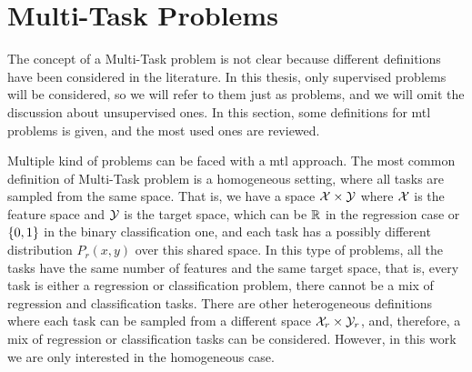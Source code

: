 \section{Multi-Task Problems}
The concept of a Multi-Task problem is not clear because different definitions have been considered in the literature. 
In this thesis, only supervised problems will be considered, so we will refer to them just as problems, and we will omit the discussion about unsupervised ones. In this section, some definitions for \acrshort{mtl} problems is given, and the most used ones are reviewed.

Multiple kind of problems can be faced with a \acrshort{mtl} approach. 
%
The most common definition of Multi-Task problem is a homogeneous setting, where all tasks are sampled from the same space. That is, we have a space $\mathcal{X} \times \mathcal{Y}$ where $\mathcal{X}$ is the feature space and $\mathcal{Y}$ is the target space, which can be $\mathbb{R}$ in the regression case or $\left\{0, 1\right\}$ in the binary classification one, and each task has a possibly different distribution $P_r(x, y)$ over this shared space.
In this type of problems, all the tasks have the same number of features and the same target space, that is, every task is either a regression or classification problem, there cannot be a mix of regression and classification tasks.
%
There are other heterogeneous definitions where each task can be sampled from a different space $\mathcal{X}_r \times \mathcal{Y}_r$, and, therefore, a mix of regression or classification tasks can be considered. However, in this work we are only interested in the homogeneous case.
%

